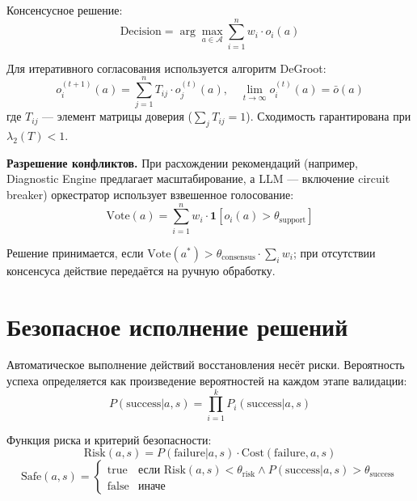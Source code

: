Консенсусное решение:
\begin{equation}
\text{Decision} = \arg\max_{a \in \mathcal{A}} \sum_{i=1}^{n} w_i \cdot o_i(a)
\label{eq:consensus}
\end{equation}

Для итеративного согласования используется алгоритм DeGroot:
\begin{equation}
o_i^{(t+1)}(a) = \sum_{j=1}^{n} T_{ij} \cdot o_j^{(t)}(a), \quad \lim_{t \to \infty} o_i^{(t)}(a) = \bar{o}(a)
\label{eq:degroot_consensus}
\end{equation}
где $T_{ij}$ --- элемент матрицы доверия ($\sum_j T_{ij} = 1$). Сходимость гарантирована при $\lambda_2(T) < 1$.

\textbf{Разрешение конфликтов.} При расхождении рекомендаций (например, Diagnostic Engine предлагает масштабирование, а LLM --- включение circuit breaker) оркестратор использует взвешенное голосование:
\begin{equation}
\text{Vote}(a) = \sum_{i=1}^{n} w_i \cdot \mathbf{1}[o_i(a) > \theta_{\text{support}}]
\label{eq:weighted_voting}
\end{equation}

Решение принимается, если $\text{Vote}(a^*) > \theta_{\text{consensus}} \cdot \sum_i w_i$; при отсутствии консенсуса действие передаётся на ручную обработку.

\section{Безопасное исполнение решений}

Автоматическое выполнение действий восстановления несёт риски. Вероятность успеха определяется как произведение вероятностей на каждом этапе валидации:
\begin{equation}
P(\text{success}|a, s) = \prod_{i=1}^{k} P_i(\text{success}|a, s)
\label{eq:success_probability}
\end{equation}

Функция риска и критерий безопасности:
\begin{equation}
\text{Risk}(a, s) = P(\text{failure}|a, s) \cdot \text{Cost}(\text{failure}, a, s)
\label{eq:risk_function}
\end{equation}
\begin{equation}
\text{Safe}(a, s) = \begin{cases}
\text{true} & \text{если } \text{Risk}(a, s) < \theta_{\text{risk}} \land P(\text{success}|a, s) > \theta_{\text{success}} \\
\text{false} & \text{иначе}
\end{cases}
\label{eq:safety_criterion}
\end{equation}

